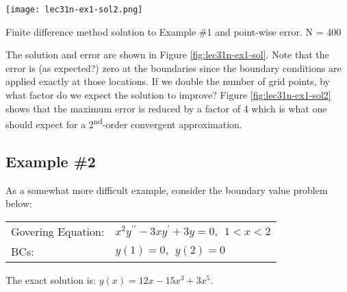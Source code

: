 \begin{marginfigure}[-2.0cm]
\texttt{[image: lec31n-ex1-sol2.png]}
\caption{Finite difference method solution to Example \#1 and point-wise error. N = 400}
\label{fig:lec31n-ex1-sol2}
\end{marginfigure}
The solution and error are shown in Figure \ref{fig:lec31n-ex1-sol}. Note that the error is (as expected?) zero at the boundaries since the boundary conditions are applied exactly at those locations.  If we double the number of grid points, by what factor do we expect the solution to improve?  Figure \ref{fig:lec31n-ex1-sol2} shows that the maximum error is reduced by a factor of 4 which is what one should expect for a 2\textsuperscript{nd}-order convergent approximation.   


\subsection{Example \#2}
As a somewhat more difficult example, consider the boundary value problem below:

\begin{table}
\begin{tabular}{l l}
Govering Equation: & $x^2y^{\prime \prime} - 3xy^{\prime} + 3y = 0, \ \ 1 < x < 2$ \\
BCs: & $y(1) = 0, \ \ y(2) = 0$ \\
\end{tabular}
\end{table}

\vspace{0.25cm}

\noindent The exact solution is: $y(x) = 12x-15x^3 + 3x^5$.

